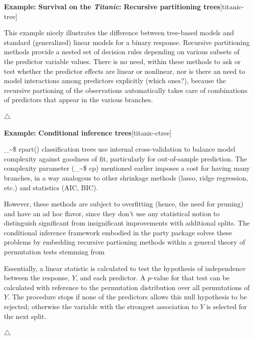 \documentclass{article}
\makeatletter
\newcommand\code{\bgroup\@makeother\_\@makeother\~\@makeother\$\@codex}
\def\@codex#1{{\normalfont\ttfamily\hyphenchar\font=-1 #1}\egroup}
\newcommand{\func}[1]{\code{#1()}}
\newcommand{\pkg}[1]{\textsf{#1}\nocite{R-#1}}
\newcommand{\Rpackage}[1]{\pkg{#1} package}
\newenvironment{Example}[2][unnamed-example]%
  {\medskip\noindent\textbf{\textsf{Example:}}
   \textbf{#2}\hfill [#1]\par\smallskip
  }
  {\hfill $\triangle$}
\makeatother
\begin{document}
\begin{Example}[titanic-tree]{Survival on the \emph{Titanic}: Recursive partitioning trees}
This example nicely illustrates the difference between tree-based models
and standard (generalized) linear models for a binary response.
Recursive partitioning methods provide a nested set of decision rules 
depending on various subsets of the predictor variable values.
There is no need, within these methods to ask or test whether 
the predictor effects are linear or nonlinear, nor is there an need
to model interactions among predictors explicitly (which ones?),
because the recursive partioning of the observations automatically
takes care of combinations of predictors that appear in the various
branches.


\end{Example}

\begin{Example}[titanic-ctree]{Conditional inference trees}

\func{rpart} classification trees use internal cross-validation
to balance model complexity against goodness of fit, particularly
for out-of-sample prediction. The complexity parameter (\code{cp})
mentioned earlier imposes a cost for having many branches,
in a way analogous to other shrinkage methods (lasso, ridge regression, etc.)
and statistics (AIC, BIC).

However, these methods are subject to overfitting (hence, the need for
pruning) and have an ad hoc flavor, since they don't use any 
statistical notion to distinguish significant from insignificant
improvements with additional splits.
The conditional inference framework embodied in the \Rpackage{party}
solves these problems by embedding recursive partioning methods within
a general theory of permutation tests stemming from
\citet{StrasserWeber:1999}

Essentially, a linear statistic is calculated to test the hypothesis
of independence between the response, $Y$, and each predictor.  A $p$-value
for that test can be calculated with reference to the permutation
distribution over all permutations of $Y$. The procedure stops if
none of the predictors allows this null hypothesis to be rejected;
otherwise the variable with the strongest association to $Y$ is
selected for the next split.



\end{Example}
\end{document}
